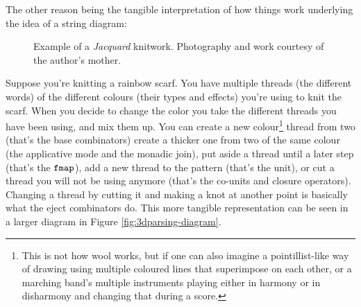 The other reason being the tangible interpretation of how things work
underlying the idea of a string diagram:

\begin{figure}
	\centering
	\caption{Example of a \emph{Jacquard} knitwork. Photography and work courtesy
		of the author's mother.}
	\label{fig:knitting-example}
\end{figure}
Suppose you're knitting a rainbow scarf.
You have multiple threads (the different words) of the different colours (their
types and effects) you're using to knit the scarf.
When you decide to change the color you take the different threads you have
been using, and mix them up.
You can create a new colour\footnote{This is not how wool works, but
	if one can also imagine a pointillist-like way of drawing using multiple
	coloured lines that superimpose on each other, or a marching band's multiple
	instruments playing either in harmony or in disharmony and changing that
	during a score.} thread from two (that's the base combinators) create a
thicker one from two of the same colour (the applicative mode and the monadic
join), put aside a thread until a later step (that's the $\texttt{fmap}$), add a new
thread to the pattern (that's the unit), or cut a thread you will not be
using anymore (that's the co-units and closure operators).
Changing a thread by cutting it and making a knot at another point is basically
what the eject combinators do.
This more tangible representation can be seen in a larger diagram in Figure
\ref{fig:3dparsing-diagram}.


